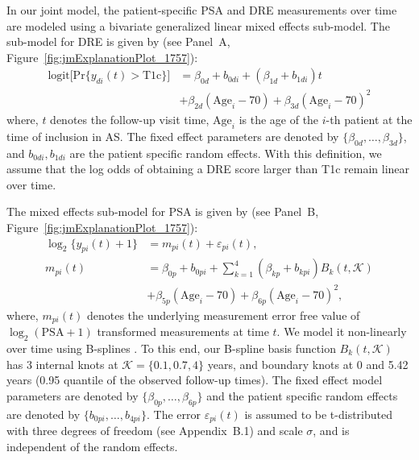 In our joint model, the patient-specific PSA and DRE measurements over time are modeled using a bivariate generalized linear mixed effects sub-model. The sub-model for DRE is given by (see Panel~A, Figure~\ref{fig:jmExplanationPlot_1757}):
\begin{equation}
\label{eq:long_model_dre}
\begin{split}
    \mbox{logit} \big[\mbox{Pr}\{y_{di}(t) > \mbox{T1c}\}\big] &= \beta_{0d} + b_{0di} + (\beta_{1d} + b_{1di}) t\\
    &+ \beta_{2d} (\mbox{Age}_i-70) + \beta_{3d} (\mbox{Age}_i-70)^2
    \end{split}
\end{equation}
where, $t$ denotes the follow-up visit time, $\mbox{Age}_i$ is the age of the $i$-th patient at the time of inclusion in AS. The fixed effect parameters are denoted by $\{\beta_{0d}, \ldots, \beta_{3d}\}$, and $b_{0di}, b_{1di}$ are the patient specific random effects. With this definition, we assume that the log odds of obtaining a DRE score larger than T1c remain linear over time. 

The mixed effects sub-model for PSA is given by (see Panel~B, Figure~\ref{fig:jmExplanationPlot_1757}):
\begin{equation}
\label{eq:long_model_psa}
\begin{split}
    \log_2 \big\{y_{pi}(t) + 1\big\} &= m_{pi}(t) + \varepsilon_{pi}(t),\\
    m_{pi}(t) &= \beta_{0p} + b_{0pi} + \sum_{k=1}^4 (\beta_{kp} + b_{kpi})  B_k(t,\mathcal{K})\\ 
    &+ \beta_{5p} (\mbox{Age}_i-70) + \beta_{6p} (\mbox{Age}_i-70)^2,
    \end{split}
\end{equation}
where, $m_{pi}(t)$ denotes the underlying measurement error free value of $\log_2 (\mbox{PSA} + 1)$ transformed \citep{pearson1994mixed,lin2000latent} measurements at time $t$. We model it non-linearly over time using B-splines \citep{de1978practical}. To this end, our B-spline basis function $B_k(t, \mathcal{K})$ has 3 internal knots at $\mathcal{K} = \{0.1, 0.7, 4\}$ years, and boundary knots at 0 and 5.42 years (0.95 quantile of the observed follow-up times). The fixed effect model parameters are denoted by $\{\beta_{0p},\ldots,\beta_{6p}\}$ and the patient specific random effects are denoted by $\{b_{0pi}, \ldots, b_{4pi}\}$. The error $\varepsilon_{pi}(t)$ is assumed to be t-distributed with three degrees of freedom (see Appendix~B.1) and scale $\sigma$, and is independent of the random effects. 

